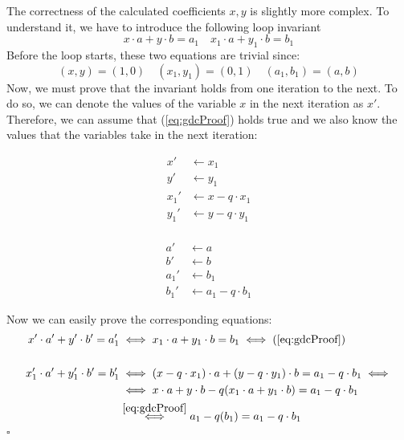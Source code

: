 The correctness of the calculated coefficients $x,y$ is slightly more complex. 
To understand it, we have to introduce the following loop invariant
\begin{equation}
		x \cdot a + y\cdot b = a_1 \quad
		x_1 \cdot a + y_1\cdot b = b_1
\label{eq:gdcProof}
\end{equation}
Before the loop starts, these two equations are trivial since: 
\[
(x,y)=(1,0) \quad  (x_1,y_1)=(0,1) \quad  (a_1,b_1)=(a,b)
\]
Now, we must prove that the invariant holds from one iteration to the
next. To do so, we can denote the values of the variable $x$ in the next
iteration as $x'$. Therefore, we can assume that (\ref{eq:gdcProof}) holds
true and we also know the values that the variables take in the next iteration:
\vspace{-20pt}

\begin{multicols}{2}

\begin{minipage}{0.4\textwidth}
\begin{alignat*}{2}
		x' &\leftarrow x_1 \\
		y' &\leftarrow y_1 \\
		x_1' &\leftarrow x-q\cdot x_1 \\
		y_1' &\leftarrow y-q\cdot y_1 \\
\end{alignat*}
\end{minipage}
\begin{minipage}{0.4\textwidth}
\begin{alignat*}{2}
		a' &\leftarrow a\\
		b' &\leftarrow b\\
		a_1' &\leftarrow b_1 \\
		b_1' &\leftarrow a_1 -q \cdot b_1
\end{alignat*}
\end{minipage}
\end{multicols}
\noindent
Now we can easily prove the corresponding equations:
\begin{alignat*}{2}
		x' \cdot a' + y' \cdot b' = a_1' &\iff
		x_1 \cdot a + y_1 \cdot b = b_1  \iff (\ref{eq:gdcProof})
		\\
		\\
		x_1' \cdot a' + y_1' \cdot b' = b_1' 
		&\iff
		(x-q\cdot x_1) \cdot a + (y-q\cdot y_1) \cdot b = a_1 -q\cdot b_1 \iff
  		\\ &\iff
		x \cdot a + y \cdot b - q( x_1 \cdot a + y_1 \cdot b )= a_1 - q \cdot b_1
		\\ &\stackrel{\ref{eq:gdcProof}}{\iff}
		a_1 - q(b_1)= a_1 - q \cdot b_1
\end{alignat*}
\hfill $\square$
\newpage

